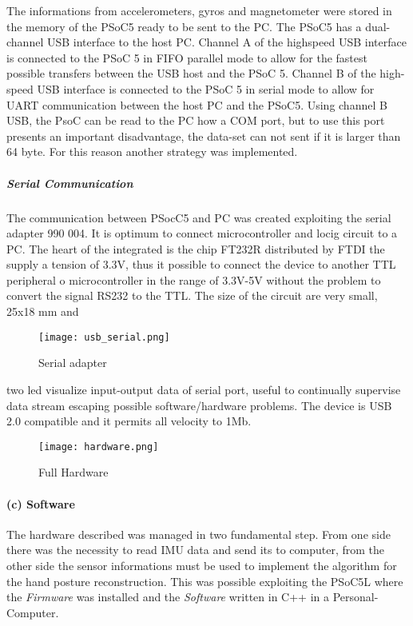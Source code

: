 The informations from accelerometers, gyros and magnetometer were stored in the  memory of the PSoC5 ready to be sent to the PC.  The PSoC5 has a dual-channel USB interface to the host PC. Channel A of the highspeed USB interface is connected to the PSoC 5 in FIFO parallel mode to allow for the fastest possible transfers between the USB host and the PSoC 5. Channel B of the high-speed USB interface is connected to the PSoC 5 in serial mode to allow for UART communication between the host PC and the PSoC5. Using channel B USB, the PsoC can be read to the PC how a COM port, but to use this port presents an important disadvantage, the data-set can not sent if it is larger than 64 byte. For this reason another strategy was implemented. \\
\newline

\subparagraph{Serial Communication}

The communication between PSocC5 and PC was created exploiting the serial adapter 990 004. It is optimum to connect microcontroller and locig circuit to a PC. The heart of the integrated is the chip FT232R distributed by FTDI the supply a tension of 3.3V, thus it possible to connect the device to another TTL peripheral o microcontroller in the range of 3.3V-5V without the problem to convert the signal RS232 to  the TTL. The size of the circuit are very small, 25x18 mm and
\begin{figure}[h]
\centering
\texttt{[image: usb\_serial.png]}
\caption{Serial adapter}
\label{fig:serial_adapter}
\end{figure}
two led visualize  input-output data of serial port, useful to continually supervise data stream escaping possible software/hardware problems. The device is USB 2.0 compatible and it permits all velocity to 1Mb. 

\begin{figure}[h]
\centering
\texttt{[image: hardware.png]}
\caption{Full Hardware}
\label{fig:hardware}
\end{figure}


\paragraph{(c) Software}

The hardware described was managed in two fundamental step.  From one side there was the necessity to read IMU data and send its to computer, from the other side the sensor informations must be used to implement the algorithm for the  hand posture reconstruction.  
This was possible exploiting the PSoC5L where the \textit{Firmware} was installed and the \textit{Software} written in C++ in a Personal-Computer.



